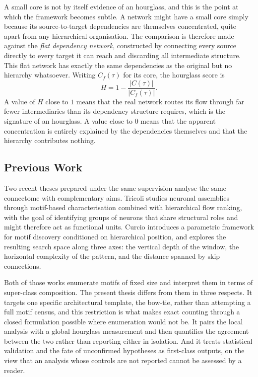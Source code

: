 \documentclass[12pt,a4paper,oneside]{article}
\theoremstyle{definition}
\theoremstyle{plain}
\begin{document}
A small core is not by itself evidence of an hourglass, and this is the
point at which the framework becomes subtle. A network might have a small
core simply because its source-to-target dependencies are themselves
concentrated, quite apart from any hierarchical organisation. The comparison
is therefore made against the \emph{flat dependency network}, constructed by
connecting every source directly to every target it can reach and discarding
all intermediate structure. This flat network has exactly the same
dependencies as the original but no hierarchy whatsoever. Writing
$C_f(\tau)$ for its core, the hourglass score is
\begin{equation}
  \label{eq:hscore}
  H = 1 - \frac{|C(\tau)|}{|C_f(\tau)|} .
\end{equation}
A value of $H$ close to $1$ means that the real network routes its flow
through far fewer intermediaries than its dependency structure requires,
which is the signature of an hourglass. A value close to $0$ means that the
apparent concentration is entirely explained by the dependencies themselves
and that the hierarchy contributes nothing.

\subsection{Previous Work}
\label{sec:related}

Two recent theses prepared under the same supervision analyse the same
connectome with complementary aims. Tricoli \cite{tricoli2025} studies
neuronal assemblies through motif-based characterisation combined with
hierarchical flow ranking, with the goal of identifying groups of neurons
that share structural roles and might therefore act as functional units.
Curcio \cite{curcio2026} introduces a parametric framework for motif
discovery conditioned on hierarchical position, and explores the resulting
search space along three axes: the vertical depth of the window, the
horizontal complexity of the pattern, and the distance spanned by
skip connections.

Both of those works enumerate motifs of fixed size and interpret them in
terms of super-class composition. The present thesis differs from them in
three respects. It targets one specific architectural template, the bow-tie,
rather than attempting a full motif census, and this restriction is what
makes exact counting through a closed formulation possible where enumeration
would not be. It pairs the local analysis with a global hourglass
measurement and then quantifies the agreement between the two rather than
reporting either in isolation. And it treats statistical validation and
the fate of unconfirmed hypotheses as first-class outputs, on the view that
an analysis whose controls are not reported cannot be assessed by a reader.
\end{document}
